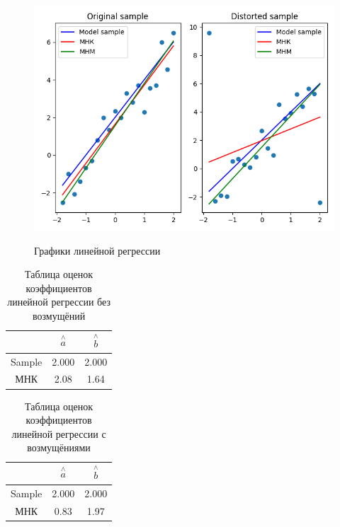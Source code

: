 \documentclass[12pt]{report}
\begin{document}
\begin{figure}[H]
    \centering
    \caption{Графики линейной регрессии}
    \includegraphics[scale = 0.6]{../lab_6/pic/plt.png} 
    \label{fig:reg}
\end{figure}

\begin{table}[H]
\caption{Таблица оценок коэффициентов линейной регрессии без возмущёний}
\label{tab:my_label1}
\begin{center}
\vspace{5mm}
\begin{tabular}{|c|c|c|}
\hline
& $\overset{\wedge}{a}$ & $\overset{\wedge}{b}$\\
\hline
Sample &2.000&2.000\\
\hline
МНК &2.08&1.64\\
\hline
\end{tabular}
\end{center}
\end{table}


\begin{table}[H]
\caption{Таблица оценок коэффициентов линейной регрессии с возмущёниями}
\label{tab:my_label2}
\begin{center}
\vspace{5mm}
\begin{tabular}{|c|c|c|}
\hline
& $\overset{\wedge}{a}$ & $\overset{\wedge}{b}$\\
\hline
Sample &2.000&2.000\\
\hline
МНК &0.83 &1.97\\
\hline
\end{tabular}
\end{center}
\end{table}
\end{document}
